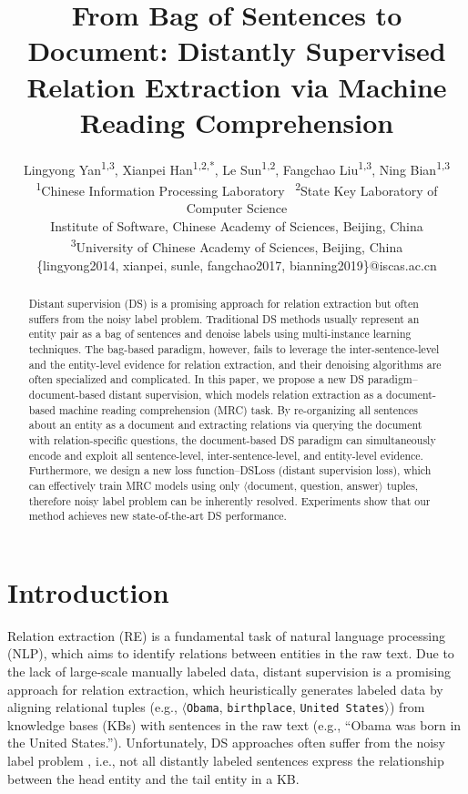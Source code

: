 \documentclass[11pt,a4paper]{article}
\title{From Bag of Sentences to Document: Distantly Supervised Relation Extraction via Machine Reading Comprehension}
\author{
  Lingyong Yan\textsuperscript{\rm 1,3},
  Xianpei Han\textsuperscript{\rm 1,2,*},
  Le Sun\textsuperscript{\rm 1,2},
  Fangchao Liu\textsuperscript{\rm 1,3},
  Ning Bian\textsuperscript{\rm 1,3}\\
  \textsuperscript{\rm 1}Chinese Information Processing Laboratory \ 
  \textsuperscript{\rm 2}State Key Laboratory of Computer Science\\
  Institute of Software, Chinese Academy of Sciences, Beijing, China\\
  \textsuperscript{\rm 3}University of Chinese Academy of Sciences, Beijing, China\\
  \{lingyong2014, xianpei, sunle, fangchao2017, bianning2019\}@iscas.ac.cn
}
\date{}
\begin{document}
\maketitle
\begin{abstract}
  Distant supervision (DS) is a promising approach for relation extraction but often suffers from the noisy label problem. Traditional DS methods usually represent an entity pair as a bag of sentences and denoise labels using multi-instance learning techniques.
  The bag-based paradigm, however, fails to leverage the inter-sentence-level and the entity-level evidence for relation extraction, and their denoising algorithms are often specialized and complicated.
  In this paper, we propose a new DS paradigm--document-based distant supervision, which models relation extraction as a document-based machine reading comprehension (MRC) task.
  By re-organizing all sentences about an entity as a document and extracting relations via querying the document with relation-specific questions, the document-based DS paradigm can simultaneously encode and exploit all sentence-level, inter-sentence-level, and entity-level evidence.
  Furthermore,  we design a new loss function--DSLoss (distant supervision loss), which can effectively train MRC models using only $\langle$document, question, answer$\rangle$ tuples, therefore noisy label problem can be inherently resolved.
  Experiments show that our method achieves new state-of-the-art DS performance.
  \end{abstract}
  
  \section{Introduction}
  Relation extraction (RE) is a fundamental task of natural language processing (NLP), which aims to identify relations between entities in the raw text.
  Due to the lack of large-scale manually labeled data, distant supervision\cite{mintz_distant_2009,hoffmann_knowledgebased_2011} is a promising approach for relation extraction, which heuristically generates labeled data by aligning relational tuples (e.g., $\langle$\texttt{Obama}, \texttt{birthplace}, \texttt{United States}$\rangle$) from knowledge bases (KBs) with sentences in the raw text (e.g., ``Obama was born in the United States.'').
  Unfortunately, DS approaches often suffer from the noisy label problem \cite{riedel_modeling_2010,hoffmann_knowledgebased_2011,zeng_distant_2015}, i.e., not all distantly labeled sentences express the relationship between the head entity and the tail entity in a KB.
  
\end{document}
